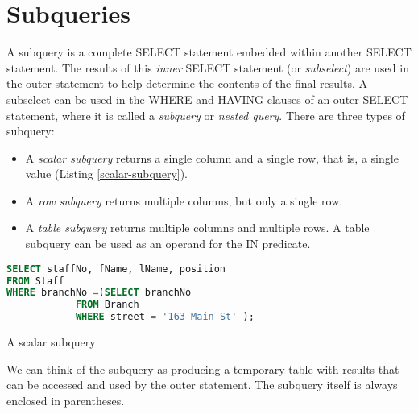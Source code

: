 \documentclass[12pt,a4paper]{article}
\begin{document}
\section{Subqueries}
A subquery is a complete SELECT statement embedded within another SELECT statement. The results of this \emph{inner} SELECT statement  (or \emph{subselect}) are used in the outer statement to help determine the contents of the final results. A subselect can be used in the WHERE and HAVING clauses of an outer SELECT statement, where it is called a \emph{subquery} or \emph{nested query}. There are three types of subquery:
\begin{itemize}
\item A \emph{scalar subquery} returns a single column and a single row, that is, a single value (Listing \ref{scalar-subquery}).
\item A \emph{row subquery} returns multiple columns, but only a single row.
\item A \emph{table subquery} returns multiple columns and multiple rows. A table subquery can be used as an operand for the IN predicate.
\end{itemize}
\begin{listing}
\begin{lstlisting}[language=sql,style=cool]
SELECT staffNo, fName, lName, position
FROM Staff
WHERE branchNo =(SELECT branchNo
     		FROM Branch
     		WHERE street = '163 Main St' );
\end{lstlisting}
\caption{A scalar subquery}\label{scalar-subquery}
\end{listing}
We can think of the subquery as producing a temporary table with results that can be accessed and used by the outer statement. The subquery itself is always enclosed in parentheses.
\end{document}
